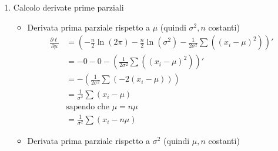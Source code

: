 \documentclass{article}  %
\theoremstyle{definition}
\begin{document}
\begin{esempio}
\begin{enumerate}
\begin{align*}
			                                   & = - \frac{1}{2} n \ln \left({2 \pi}\right) - \frac{n}{2} \ln \left(\sigma^2\right) -\frac{1}{2\sigma^2} \sum \left(\left({x_i-\mu}\right)^2\right)                                                            \\
			                                   & = - \frac{n}{2} \ln \left({2 \pi}\right) - \frac{n}{2} \ln \left(\sigma^2\right) -\frac{1}{2\sigma^2} \sum \left(\left({x_i-\mu}\right)^2\right)                                                              \\
		      \end{align*}
		\item Calcolo derivate prime parziali
		      \begin{itemize}
			      \item Derivata prima parziale rispetto a $\mu$ (quindi $\sigma^2, n$ costanti)
			            \begin{align*}
				            \frac{\partial \ell}{\partial \mu} & = \left(- \frac{n}{2} \ln \left({2 \pi}\right) - \frac{n}{2} \ln \left(\sigma^2\right) -\frac{1}{2\sigma^2} \sum \left(\left({x_i-\mu}\right)^2\right)\right)' \\
				                                               & = - 0 - 0 -  \left(\frac{1}{2\sigma^2} \sum \left(\left({x_i-\mu}\right)^2\right)\right)'                                                                      \\
				                                               & = -  \left(\frac{1}{2\sigma^2} \sum \left(-2\left({x_i-\mu}\right)\right)\right)                                                                               \\
				                                               & = \frac{1}{\sigma^2} \sum \left({x_i-\mu}\right)                                                                                                               \\
				                                               & \text{sapendo che } \mu = n\mu                                                                                                                                 \\
				                                               & = \frac{1}{\sigma^2} \sum \left({x_i-n\mu}\right)
			            \end{align*}
			      \item Derivata prima parziale rispetto a $\sigma^2$ (quindi $\mu, n$ costanti)
			            \begin{align*}

\end{align*}
\end{itemize}
\end{enumerate}
\end{esempio}
\end{document}
